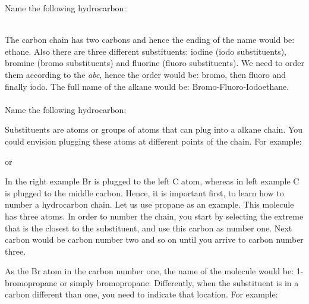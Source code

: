 \documentclass[main.tex]{subfiles}
\begin{document}
\begin{description}
\begin{example} %
Name the following hydrocarbon:
\begin{center} \end{center}
\\
The carbon chain has two carbons and hence the ending of the name would be: ethane. Also there are three different substituents: iodine (iodo substituents), bromine (bromo substituents) and fluorine (fluoro substituents). We need to order them according to the \emph{abc}, hence the order would be: bromo, then fluoro and finally iodo. The full name of the alkane would be: Bromo-Fluoro-Iodoethane.
\\
\faDiamond\ \\
Name the following hydrocarbon:
\begin{center} \end{center}
\end{example}%


\item[\docfilehook{  Numbering the chain}{Numbering the chain}] Substituents are atoms or groups of atoms that can plug into a alkane chain. You could envision plugging these atoms at different points of the chain. For example:
\begin{center}  \hspace{0.5cm}or\hspace{0.5cm} \end{center}

In the right example Br is plugged to the left C atom, whereas in left example C is plugged to the middle carbon. Hence, it is important first, to learn how to number a hydrocarbon chain. Let us use propane as an example. This molecule has three atoms. In order to number the chain, you start by selecting the extreme that is the closest to the substituent, and use this carbon as number one. Next carbon would be carbon number two and so on until you arrive to carbon number three. 
\begin{center}\end{center}
As the Br atom in the carbon number one, the name of the molecule would be: 1-bromopropane or simply bromopropane. Differently, when the substituent is in a carbon different than one, you need to indicate that location. For example:


\end{description}
\end{document}
